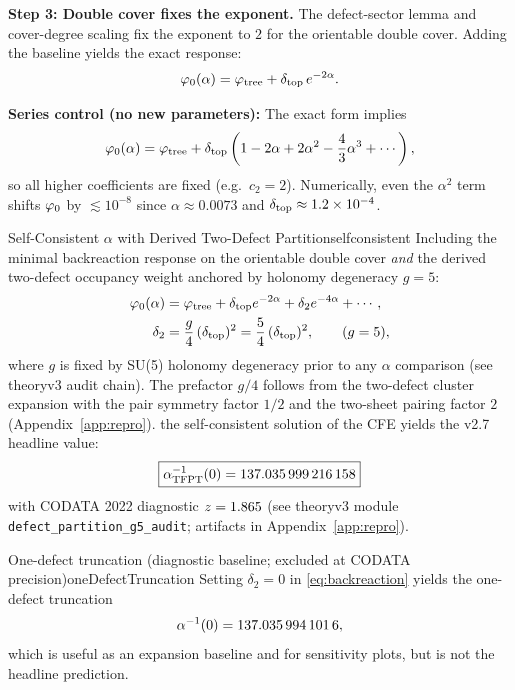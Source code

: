 \textbf{Step 3: Double cover fixes the exponent.}
The defect-sector lemma and cover-degree scaling fix the exponent to $2$ for the
orientable double cover. Adding the baseline yields the exact response:
\begin{equation}
    \varphi_0(\alpha) = \varphi_{\mathrm{tree}} + \delta_{\mathrm{top}}\,e^{-2\alpha}.
\end{equation}

\begin{remark}
\textbf{Series control (no new parameters):} The exact form implies
\begin{equation}
    \varphi_0(\alpha)=\varphi_{\mathrm{tree}}+\delta_{\mathrm{top}}\left(1-2\alpha+2\alpha^2-\frac{4}{3}\alpha^3+\cdots\right),
\end{equation}
so all higher coefficients are fixed (e.g.\ $c_2=2$). Numerically, even the
$\alpha^2$ term shifts $\varphi_0$ by $\lesssim 10^{-8}$ since
$\alpha\approx 0.0073$ and $\delta_{\mathrm{top}}\approx 1.2\times10^{-4}$.
\end{remark}

\begin{theorem}{Self-Consistent $\alpha$ with Derived Two-Defect Partition}{selfconsistent}
Including the minimal backreaction response on the orientable double cover \emph{and} the derived two-defect occupancy weight anchored by holonomy degeneracy $g=5$:
\begin{align}
    \varphi_0(\alpha) &= \varphi_{\mathrm{tree}} + \delta_{\mathrm{top}} e^{-2\alpha} + \delta_2 e^{-4\alpha} + \cdots,
    \label{eq:backreaction}\\
    \delta_2 &= \frac{g}{4}\,(\delta_{\mathrm{top}})^2 = \frac54\,(\delta_{\mathrm{top}})^2,
    \qquad (g=5),
\end{align}
where $g$ is fixed by SU(5) holonomy degeneracy prior to any $\alpha$ comparison (see theoryv3 audit chain).
The prefactor $g/4$ follows from the two-defect cluster expansion with the pair symmetry
factor $1/2$ and the two-sheet pairing factor $2$ (Appendix~\ref{app:repro}).
the self-consistent solution of the CFE yields the v2.7 headline value:
\begin{equation}
    \boxed{\alpha^{-1}_{\text{TFPT}}(0) = \num[round-mode=places,round-precision=12]{\TFPTalphaInvGOverFourNum}}
\end{equation}
with CODATA 2022 diagnostic $z=\num[round-mode=places,round-precision=3]{\TFPTalphaZGOverFourNum}$ (see theoryv3 module \texttt{defect\_partition\_g5\_audit}; artifacts in Appendix~\ref{app:repro}).
\end{theorem}

\begin{lemma}{One-defect truncation (diagnostic baseline; excluded at CODATA precision)}{oneDefectTruncation}
Setting $\delta_2=0$ in \eqref{eq:backreaction} yields the one-defect truncation
\[
\alpha^{-1}(0)=\num[round-mode=places,round-precision=10]{\TFPTalphaInvSelfNum},
\]
which is useful as an expansion baseline and for sensitivity plots, but is not the headline prediction.
\end{lemma}

